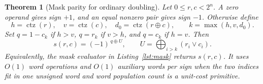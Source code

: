 \documentclass[11pt]{article}
\newtheorem{theorem}{Theorem}
\newcommand{\ctz}{\operatorname{ctz}}
\begin{document}
\begin{theorem}[Mask parity for ordinary doubling]
\label{thm:mask}
Let \(0\leq r,c<2^n\). A zero operand gives sign \(+1\), and
an equal nonzero pair gives sign \(-1\). Otherwise define
\[
 h=\ctz(r),\quad v=\ctz(c),\quad d_0=\ctz(r\oplus c),
 \qquad k=\max(h,v,d_0).
\]
Set \(q=1-c_k\) if \(h>v\), \(q=r_k\) if \(v>h\), and
\(q=c_k\) if \(h=v\). Then
\begin{equation}
 s(r,c)=(-1)^{\,q\oplus U},\qquad
 U=\bigoplus_{i>k}(r_i\lor c_i).
 \label{eq:upper}
\end{equation}
Equivalently, the mask evaluator in Listing~\ref{lst:mask} returns
\(s(r,c)\). It uses \(O(1)\) word operations and \(O(1)\) auxiliary
words per sign when the two indices fit in one unsigned word and word
population count is a unit-cost primitive.
\end{theorem}
\end{document}
